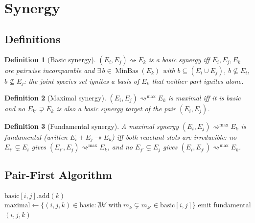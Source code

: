 \documentclass[11pt]{article}
\theoremstyle{plain}
\newtheorem{definition}{Definition}
\theoremstyle{remark}
\newcommand{\MinBas}{\operatorname{MinBas}}
\newcommand{\E}{\mathcal{E}}
\begin{document}
\section{Synergy}\label{sec:stage3}

\subsection{Definitions~\cite{BMBcompanion}}

\begin{definition}[Basic synergy]
$(E_i, E_j) \rightsquigarrow E_k$ is a \emph{basic synergy} iff
$E_i, E_j, E_k$ are pairwise incomparable and
$\exists\, b \in \MinBas(E_k)$ with
$b \subseteq (E_i \cup E_j)$, $b \not\subseteq E_i$, $b \not\subseteq E_j$:
the joint species set ignites a basis of $E_k$ that neither part ignites
alone.
\end{definition}

\begin{definition}[Maximal synergy]
$(E_i, E_j) \rightsquigarrow^{\max} E_k$ is \emph{maximal} iff it is basic
and no $E_{k'} \supsetneq E_k$ is also a basic synergy target of the pair
$(E_i, E_j)$.
\end{definition}

\begin{definition}[Fundamental synergy]
\label{def:fund_syn}
A maximal synergy $(E_i, E_j) \rightsquigarrow^{\max} E_k$ is
\emph{fundamental} (written $E_i+E_j\twoheadrightarrow E_k$) iff both
reactant slots are irreducible: no $E_{i'} \subsetneq E_i$ gives
$(E_{i'}, E_j) \rightsquigarrow^{\max} E_k$, and no $E_{j'} \subsetneq E_j$
gives $(E_i, E_{j'}) \rightsquigarrow^{\max} E_k$.
\end{definition}

\subsection{Pair-First Algorithm}

\begin{algorithm}[t]
\caption{ComputeFundamentalSynergies-PairFirst($\E$, hier)}\label{alg:syn}
\begin{algorithmic}[1]
    \If{$\exists\, b \in \MinBas(k):\; b \subseteq m_i|m_j,\; b\not\subseteq m_i,\; b\not\subseteq m_j$}
      \State $\text{basic}[i,j].\text{add}(k)$
    \EndIf
  \EndFor
\EndFor
\State $\text{maximal} \leftarrow \{(i,j,k) \in \text{basic} :
  \nexists k'\ \text{with}\ m_k \subsetneq m_{k'} \in \text{basic}[i,j]\}$
    \State emit fundamental$(i,j,k)$
  \EndIf
\EndFor
\end{algorithmic}
\end{algorithm}
\end{document}

